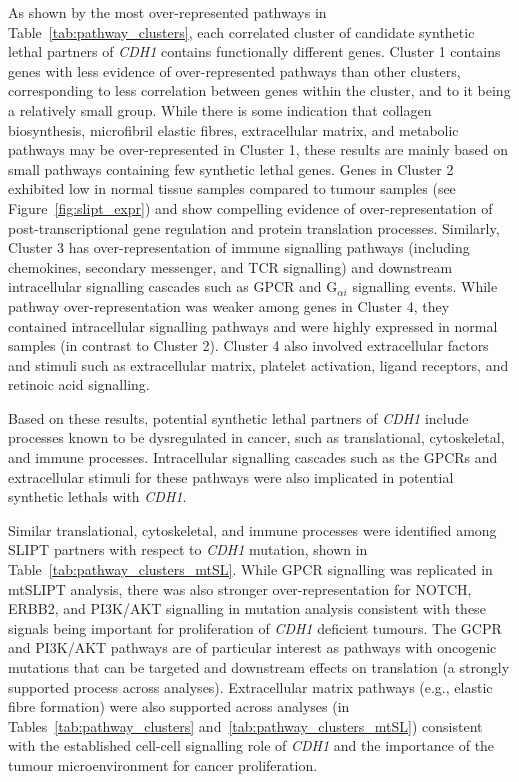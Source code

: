 As shown by the most over-represented pathways in Table~\ref{tab:pathway_clusters}, each correlated cluster of candidate \gls{synthetic lethal} partners of \textit{CDH1} contains functionally different genes. %
Cluster 1 contains genes with less evidence of over-represented pathways than other clusters, corresponding to less correlation between genes within the cluster, and to it being a relatively small group. While there is some indication that collagen biosynthesis, microfibril elastic fibres, extracellular matrix, and metabolic pathways may be over-represent\-ed in Cluster 1, these results are mainly based on small pathways containing few \gls{synthetic lethal} genes. Genes in Cluster 2 exhibited low  in normal tissue samples compared to tumour samples (see Figure~\ref{fig:slipt_expr}) and show compelling evidence of over-represent\-ation of post-transcriptional gene regulation and protein translation processes. Similarly, Cluster 3 has over-represent\-ation of immune signalling pathways (including chemokines, secondary messenger, and TCR signalling) and downstream intracellular signalling cascades such as \gls{GPCR} and  G$_{\alpha i}$ signalling events. While pathway over-represent\-ation was weaker among genes in Cluster 4, they contained intracellular signalling pathways and were highly expressed in normal samples (in contrast to Cluster 2). Cluster 4 also involved extracellular factors and stimuli such as extracellular matrix, platelet activation, ligand receptors, and retinoic acid signalling.

Based on these results, potential \gls{synthetic lethal} partners of \textit{CDH1} include processes known to be dysregulated in cancer, such as translational, cytoskeletal, and immune processes. Intracellular signalling cascades such as the \glspl{GPCR} and extracellular stimuli for these pathways were also implicated in potential \glspl{synthetic lethal} with \textit{CDH1}.

Similar translational, cytoskeletal, and immune processes were identified among \gls{SLIPT} partners with respect to \textit{CDH1} \gls{mutation}, shown in Table~\ref{tab:pathway_clusters_mtSL}. While \gls{GPCR} signalling was replicated in \acrshort{mtSLIPT} analysis, there was also stronger over-representation for NOTCH, ERBB2, and PI3K/AKT signalling in \gls{mutation} analysis consistent with these signals being important for proliferation of \textit{CDH1} deficient tumours. The GCPR and PI3K/AKT pathways are of particular interest as pathways with oncogenic \glspl{mutation} that can be targeted and downstream effects on translation (a strongly supported process across analyses). Extracellular matrix pathways (e.g., elastic fibre formation) were also supported across analyses (in Tables~\ref{tab:pathway_clusters} and~\ref{tab:pathway_clusters_mtSL}) consistent with the established cell-cell signalling role of \textit{CDH1} and the importance of the tumour microenvironment for cancer proliferation.

